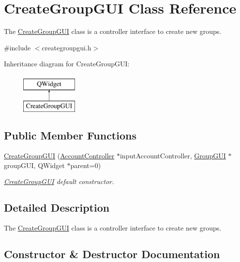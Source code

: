 \hypertarget{classCreateGroupGUI}{}\section{Create\+Group\+G\+UI Class Reference}
\label{classCreateGroupGUI}


The \hyperlink{classCreateGroupGUI}{Create\+Group\+G\+UI} class is a controller interface to create new groups.  




{\ttfamily \#include $<$creategroupgui.\+h$>$}

Inheritance diagram for Create\+Group\+G\+UI\+:\begin{figure}[H]
\begin{center}
\leavevmode
\includegraphics[height=2.000000cm]{classCreateGroupGUI}
\end{center}
\end{figure}
\subsection*{Public Member Functions}
\begin{DoxyCompactItemize}
\item 
\hyperlink{classCreateGroupGUI_af7473767697f5b03a6113136cf471eda}{Create\+Group\+G\+UI} (\hyperlink{classAccountController}{Account\+Controller} $\ast$input\+Account\+Controller, \hyperlink{classGroupGUI}{Group\+G\+UI} $\ast$group\+G\+UI, Q\+Widget $\ast$parent=0)
\begin{DoxyCompactList}\small\item\em \hyperlink{classCreateGroupGUI}{Create\+Group\+G\+UI} default constructor. \end{DoxyCompactList}\end{DoxyCompactItemize}


\subsection{Detailed Description}
The \hyperlink{classCreateGroupGUI}{Create\+Group\+G\+UI} class is a controller interface to create new groups. 

\subsection{Constructor \& Destructor Documentation}
